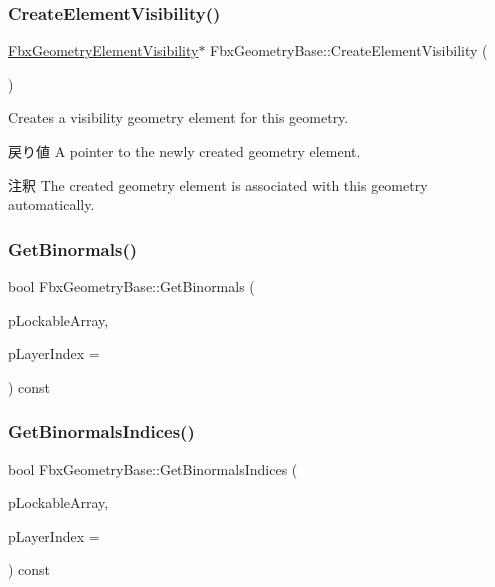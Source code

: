 \subsubsection{\texorpdfstring{Create\+Element\+Visibility()}{CreateElementVisibility()}}
{\footnotesize\ttfamily \hyperlink{fbxlayer_8h_a98f6c16a3021e9e04b0352f652eac2a1}{Fbx\+Geometry\+Element\+Visibility}$\ast$ Fbx\+Geometry\+Base\+::\+Create\+Element\+Visibility (\begin{DoxyParamCaption}{ }\end{DoxyParamCaption})}

Creates a visibility geometry element for this geometry. \begin{DoxyReturn}{戻り値}
A pointer to the newly created geometry element. 
\end{DoxyReturn}
\begin{DoxyRemark}{注釈}
The created geometry element is associated with this geometry automatically. 
\end{DoxyRemark}
\mbox{\label{class_fbx_geometry_base_a935f60845a0b9a5d484a8540f52ee07d}} 
\subsubsection{\texorpdfstring{Get\+Binormals()}{GetBinormals()}}
{\footnotesize\ttfamily bool Fbx\+Geometry\+Base\+::\+Get\+Binormals (\begin{DoxyParamCaption}\item[{\hyperlink{class_fbx_layer_element_array_template}{Fbx\+Layer\+Element\+Array\+Template}$<$ \hyperlink{class_fbx_vector4}{Fbx\+Vector4} $>$ $\ast$$\ast$}]{p\+Lockable\+Array,  }\item[{const int}]{p\+Layer\+Index = {} }\end{DoxyParamCaption}) const}

\mbox{\label{class_fbx_geometry_base_af3b46f6aaa0e79c91ad7a89977413f57}} 
\subsubsection{\texorpdfstring{Get\+Binormals\+Indices()}{GetBinormalsIndices()}}
{\footnotesize\ttfamily bool Fbx\+Geometry\+Base\+::\+Get\+Binormals\+Indices (\begin{DoxyParamCaption}\item[{\hyperlink{class_fbx_layer_element_array_template}{Fbx\+Layer\+Element\+Array\+Template}$<$ int $>$ $\ast$$\ast$}]{p\+Lockable\+Array,  }\item[{const int}]{p\+Layer\+Index = {} }\end{DoxyParamCaption}) const}


